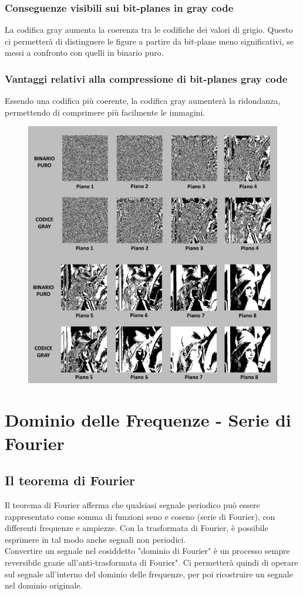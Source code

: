 \documentclass{report}
\begin{document}
	\newpage
	
	\subsection{Conseguenze visibili sui bit-planes in gray code}
	La codifica gray aumenta la coerenza tra le codifiche dei valori di grigio. Questo ci permetterà di distinguere le figure a partire da bit-plane meno significativi, se messi a confronto con quelli in binario puro.
	
	\subsection{Vantaggi relativi alla compressione di bit-planes gray code}
	Essendo una codifica più coerente, la codifica gray aumenterà la ridondanza, permettendo di comprimere più facilmente le immagini.
	
	\begin{figure}[htp]
		\centering
		\includegraphics[width=1\linewidth]{grayvspure.png}
	\end{figure}
	\chapter{Dominio delle Frequenze - Serie di Fourier}
	\section{Il teorema di Fourier}
	Il teorema di Fourier afferma che qualsiasi segnale periodico può essere rappresentato come somma di funzioni seno e coseno (serie di Fourier), con differenti frequenze e ampiezze. Con la trasformata di Fourier, è possibile esprimere in tal modo anche segnali non periodici. \\
	Convertire un segnale nel cosiddetto "dominio di Fourier" è un processo sempre reversibile grazie all'anti-trasformata di Fourier". Ci permetterà quindi di operare sul segnale all'interno del dominio delle frequenze, per poi ricostruire un segnale nel dominio originale.
\end{document}
